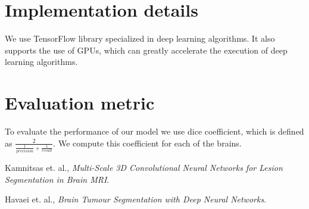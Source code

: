 \documentclass[12pt]{report}
\begin{document}
\section*{Implementation details}

We use TensorFlow library specialized in deep learning algorithms. It also supports the use of GPUs, which can greatly accelerate the execution of deep learning algorithms.

\section*{Evaluation metric}

To evaluate the performance of our model we use dice coefficient, which is defined as $\frac{2}{\frac{1}{precision}+ \frac{1}{recall}}$. We compute this coefficient for each of the brains.


\begin{thebibliography}{ABCDE}

 Kamnitsas et. al., {\em Multi-Scale 3D Convolutional Neural Networks for Lesion Segmentation in Brain MRI}.

 Havaei et. al., {\em Brain Tumour Segmentation with Deep Neural Networks}.

\end{thebibliography}
\end{document}
